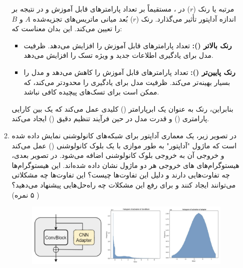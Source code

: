 \documentclass[12pt]{article}
\begin{document}
\begin{enumerate}
\begin{enumerate}
{        مرتبه یا رنک ($r$) در ، مستقیماً بر تعداد پارامترهای قابل آموزش و در نتیجه بر اندازه آداپتور  تأثیر می‌گذارد. رنک ($r$) بُعد میانی ماتریس‌های تجزیه‌شده $A$ و $B$ را تعیین می‌کند. این بدان معناست که:
        \begin{itemize}
            \item \textbf{رنک بالاتر ():} تعداد پارامترهای قابل آموزش را افزایش می‌دهد. ظرفیت مدل برای یادگیری اطلاعات جدید و ویژه تسک را افزایش می‌دهد.
            \item \textbf{رنک پایین‌تر ():} تعداد پارامترهای قابل آموزش را کاهش می‌دهد و مدل را بسیار بهینه‌تر می‌کند. ظرفیت مدل برای یادگیری را محدودتر می‌کند، که ممکن است برای تسک‌های پیچیده کافی نباشد.
        \end{itemize}
        بنابراین، رنک به عنوان یک ابرپارامتر () کلیدی عمل می‌کند که یک \textbf{} بین کارایی پارامتری () و قدرت مدل در حین فرآیند تنظیم دقیق () ایجاد می‌کند.\\}
        
        \item در تصویر زیر، یک معماری آداپتور برای شبکه‌های کانولوشنی نمایش داده شده است که ماژول "آداپتور" به‌ طور موازی با یک بلوک کانولوشنی () عمل می‌کند و خروجی آن به خروجی بلوک کانولوشنی اضافه می‌شود. در تصویر بعدی، هیستوگرام‌های  های خروجی هر دو ماژول نشان داده شده‌اند. این هیستوگرام‌ها چه تفاوت‌هایی دارند و دلیل این تفاوت‌ها چیست؟ این تفاوت‌ها چه مشکلاتی می‌توانند ایجاد کنند و برای رفع این مشکلات چه راه‌حل‌هایی پیشنهاد می‌دهید؟ ( ۵ نمره)
        \begin{figure}[h]
            \centering
            \includegraphics[width=\textwidth]{figs/Q2_4.png}
            \label{fig:q4}  
        \end{figure}


\end{enumerate}
\end{enumerate}
\end{document}
